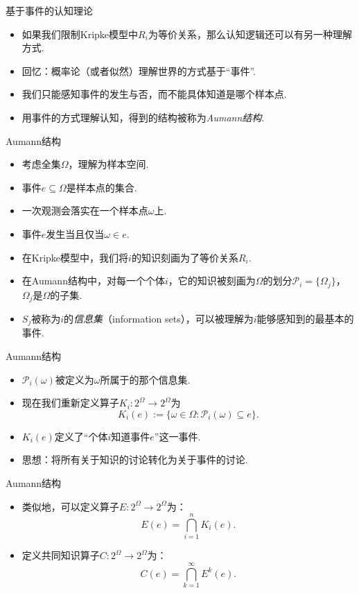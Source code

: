 {基于事件的认知理论}
\begin{itemize}
    \item 如果我们限制Kripke模型中$R_i$为等价关系，那么认知逻辑还可以有另一种理解方式.
    \item 回忆：概率论（或者似然）理解世界的方式基于“事件”.
    \item 我们只能感知事件的发生与否，而不能具体知道是哪个样本点.
    \item 用事件的方式理解认知，得到的结构被称为\emph{Aumann结构}.
\end{itemize}


{Aumann结构}
\begin{itemize}
    \item 考虑全集$\Omega$，理解为样本空间.
    \item 事件$e\subseteq \Omega$是样本点的集合.
    \item 一次观测会落实在一个样本点$\omega$上.
    \item 事件$e$发生当且仅当$\omega\in e$.
    \item 在Kripke模型中，我们将$i$的知识刻画为了等价关系$R_i$.
    \item 在Aumann结构中，对每一个个体$i$，它的知识被刻画为$\Omega$的划分$\mathcal P_i=\{\Omega_j\}$，$\Omega_j$是$\Omega$的子集.
    \item $S_j$被称为$i$的\emph{信息集}（information sets），可以被理解为$i$能够感知到的最基本的事件.
\end{itemize}    


{Aumann结构}
\begin{itemize}
    \item $\mathcal P_i(\omega)$被定义为$\omega$所属于的那个信息集.
    \item 现在我们重新定义算子$K_i:2^\Omega\to 2^\Omega$为
    \[K_i(e):=\{\omega\in\Omega:\mathcal P_i(\omega)\subseteq e\}.\]
    \item $K_i(e)$定义了“个体$i$知道事件$e$”这一事件.
    \item 思想：将所有关于知识的讨论转化为关于事件的讨论.
\end{itemize}


{Aumann结构}
\begin{itemize}
    \item 类似地，可以定义算子$E:2^\Omega\to 2^\Omega$为：
    \[E(e)=\bigcap_{i=1}^n K_i(e).\]
    \item 定义共同知识算子$C:2^\Omega\to 2^\Omega$为：
    \[C(e)=\bigcap_{k=1}^\infty E^k(e).\]
\end{itemize}


